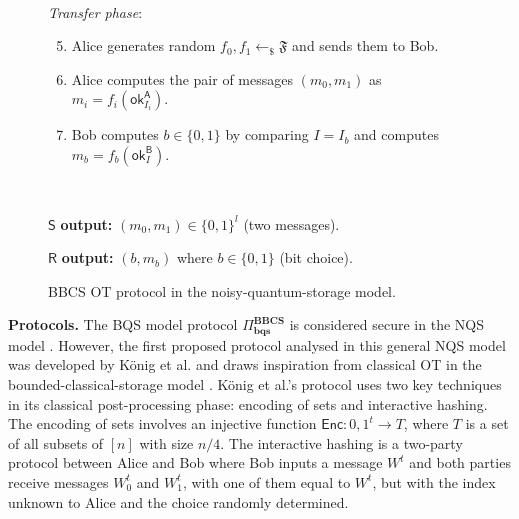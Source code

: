 \begin{figure}[h!]
\begin{tcolorbox}
    \
    
    \textit{Transfer phase}:
            \begin{enumerate}
            \setcounter{enumi}{4}
                \item Alice generates random $f_0, f_1 \leftarrow_{\$}\mathfrak{F}$ and sends them to Bob.
                \item Alice computes the pair of messages $(m_0, m_1)$ as $m_i = f_i(\mathsf{ok}^{\mathsf{A}}_{I_{i}})$.
                \item Bob computes $b\in\{0, 1\}$ by comparing $I = I_b$ and computes $m_b = f_b(\mathsf{ok}^{\mathsf{B}}_{I})$. 
            \end{enumerate}
    
    
   
    
    \
    
$\mathsf{S}$ \textbf{output:} $(m_0, m_1)\in\{0,1\}^l$ (two messages).

$\mathsf{R}$ \textbf{output:} $(b, m_b)$ where $b\in\{0,1\}$ (bit choice).
    
\end{tcolorbox}
    \caption{BBCS OT protocol in the noisy-quantum-storage model.}
    \label{fig:BBCS_Noisy}
\end{figure}

\noindent\textbf{Protocols.} The BQS model protocol $\Pi^{\textbf{BBCS}}_{\textbf{bqs}}$ is considered secure in the NQS model \cite{S10}. However, the first proposed protocol analysed in this general NQS model was developed by K\"onig et al. \cite{KWW12} and draws inspiration from classical OT in the bounded-classical-storage model \cite{CCM98, DHRS04, S07}. K\"onig et al.'s protocol uses two key techniques in its classical post-processing phase: encoding of sets and interactive hashing. The encoding of sets involves an injective function $\mathsf{Enc}: {0,1}^t \rightarrow T$, where $T$ is a set of all subsets of $[n]$ with size $n/4$. The interactive hashing is a two-party protocol between Alice and Bob where Bob inputs a message $W^t$ and both parties receive messages $W^t_0$ and $W^t_1$, with one of them equal to $W^t$, but with the index unknown to Alice and the choice randomly determined.  %



